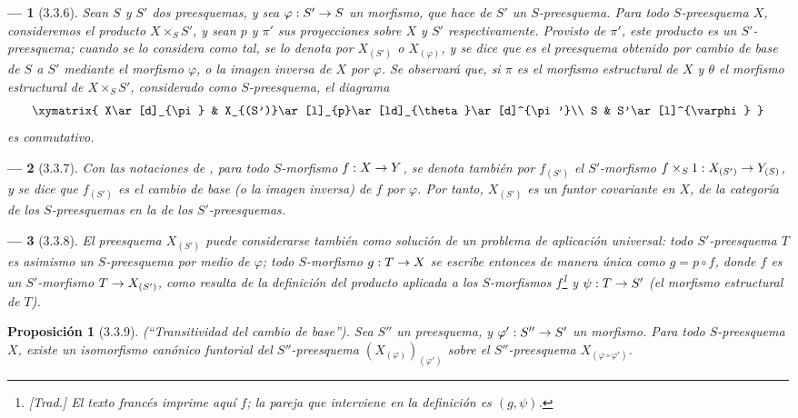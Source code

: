 \documentclass[oneside]{amsart}
\theoremstyle{ega-env-style}
\newtheorem*{env}{---}
\theoremstyle{ega-thm-env-style}
\newtheorem*{proposition}{Proposición}
\theoremstyle{ega-defn-env-style}
\renewcommand{\to}{\mathchoice{\longrightarrow}{\rightarrow}{\rightarrow}{\rightarrow}}
\let\EGAOriginalLabel\label
\renewcommand{\label}[1]{\phantomsection\EGAOriginalLabel{#1}}
\begin{document}
\begin{env}[3.3.6]
\label{I.3.3.6}
Sean $S$ y $S'$ dos preesquemas, y sea $\varphi:S'\to S$ un morfismo, que hace de $S'$ un
$S$-preesquema. Para todo $S$-preesquema $X$, consideremos el producto $X\times_S S'$,
y sean $p$ y $\pi'$ sus proyecciones sobre $X$ y $S'$ respectivamente. Provisto
de $\pi'$, este producto es un $S'$-preesquema; cuando se lo considera como tal, se
lo denota por $X_{(S')}$ o $X_{(\varphi)}$, y se dice que es el preesquema
obtenido por \emph{cambio de base} de $S$ a $S'$ mediante el morfismo
$\varphi$, o la \emph{imagen inversa} de $X$ por $\varphi$. Se observará que, si $\pi$ es
el morfismo estructural de $X$ y $\theta$ el morfismo estructural de
$X\times_S S'$, considerado como $S$-preesquema, el diagrama
\label{I.3.3.6.base-change-diagram-fr}
\[
  \xymatrix{
    X\ar[d]_{\pi} &
    X_{(S')}\ar[l]_{p}\ar[ld]_{\theta}\ar[d]^{\pi'}\\
    S & S'\ar[l]^{\varphi}
  }
\]
es conmutativo.
\end{env}

\begin{env}[3.3.7]
\label{I.3.3.7}
Con las notaciones de , para todo $S$-morfismo $f:X\to Y$, se
denota también por $f_{(S')}$ el $S'$-morfismo $f\times_S 1:X_{(S')}\to Y_{(S)}$, y
se dice que $f_{(S')}$ es el \emph{cambio de base} (o la \emph{imagen inversa}) de
$f$ por $\varphi$. Por tanto, $X_{(S')}$ es un \emph{funtor covariante} en $X$, de
la categoría de los $S$-preesquemas en la de los $S'$-preesquemas.
\end{env}

\begin{env}[3.3.8]
\label{I.3.3.8}
El preesquema $X_{(S')}$ puede considerarse también como solución de un
\emph{problema de aplicación universal}: todo $S'$-preesquema $T$ es asimismo un
$S$-preesquema por medio de $\varphi$; todo $S$-morfismo $g:T\to X$ se escribe entonces
de manera única como $g=p\circ f$, donde $f$ es un $S'$-morfismo
$T\to X_{(S')}$, como resulta de la definición del producto aplicada a los
$S$-morfismos $f$\footnote{\emph{[Trad.] El texto francés imprime aquí $f$;
la pareja que interviene en la definición es $(g,\psi)$.}} y
$\psi:T\to S'$ (el morfismo estructural de $T$).
\end{env}

\begin{proposition}[3.3.9]
\label{I.3.3.9}
\emph{(``Transitividad del cambio de base'')}. Sea $S''$ un preesquema, y
$\varphi':S''\to S'$ un morfismo. Para todo $S$-preesquema $X$, existe un
isomorfismo canónico funtorial del $S''$-preesquema
$(X_{(\varphi)})_{(\varphi')}$ sobre el $S''$-preesquema $X_{(\varphi\circ\varphi')}$.
\end{proposition}
\end{document}
